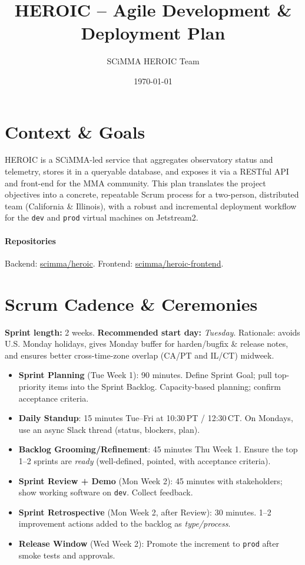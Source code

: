 \documentclass[11pt]{article}
\title{HEROIC -- Agile Development \& Deployment Plan}
\author{SCiMMA HEROIC Team}
\date{\today}
\begin{document}
\maketitle

\section{Context \& Goals}
HEROIC is a SCiMMA-led service that aggregates observatory status and telemetry, stores it in a queryable database, and exposes it via a RESTful API and front-end for the MMA community. This plan translates the project objectives into a concrete, repeatable Scrum process for a two-person, distributed team (California \& Illinois), with a robust and incremental deployment workflow for the \texttt{dev} and \texttt{prod} virtual machines on Jetstream2.

\paragraph{Repositories} Backend: \href{https://github.com/scimma/heroic}{scimma/heroic}. Frontend: \href{https://github.com/scimma/heroic-frontend}{scimma/heroic-frontend}.

\section{Scrum Cadence \& Ceremonies}
\textbf{Sprint length:} 2 weeks. \textbf{Recommended start day:} \emph{Tuesday}. Rationale: avoids U.S. Monday holidays, gives Monday buffer for harden/bugfix \& release notes, and ensures better cross-time-zone overlap (CA/PT and IL/CT) midweek.

\begin{itemize}[leftmargin=1.2em]
  \item \textbf{Sprint Planning} (Tue Week 1): 90 minutes. Define Sprint Goal; pull top-priority items into the Sprint Backlog. Capacity-based planning; confirm acceptance criteria.
  \item \textbf{Daily Standup}: 15 minutes Tue--Fri at 10:30\,PT / 12:30\,CT. On Mondays, use an async Slack thread (status, blockers, plan).
  \item \textbf{Backlog Grooming/Refinement}: 45 minutes Thu Week 1. Ensure the top 1--2 sprints are \emph{ready} (well-defined, pointed, with acceptance criteria).
  \item \textbf{Sprint Review + Demo} (Mon Week 2): 45 minutes with stakeholders; show working software on \texttt{dev}. Collect feedback.
  \item \textbf{Sprint Retrospective} (Mon Week 2, after Review): 30 minutes. 1--2 improvement actions added to the backlog as \emph{type/process}.
  \item \textbf{Release Window} (Wed Week 2): Promote the increment to \texttt{prod} after smoke tests and approvals.
\end{itemize}
\end{document}
